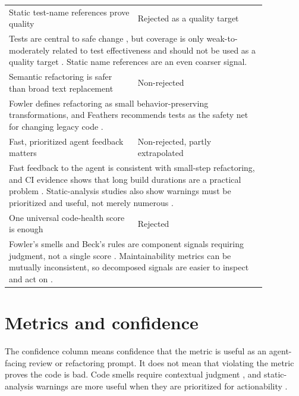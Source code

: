 \documentclass[11pt]{article}
\begin{document}
\begin{longtable}{p{0.43\linewidth}p{0.43\linewidth}}
\rowcolor{gray!18}
Static test-name references prove quality & Rejected as a quality target \\
\multicolumn{2}{p{0.86\linewidth}}{
Tests are central to safe change \cite{fowler-refactoring,feathers}, but coverage
is only weak-to-moderately related to test effectiveness and should not be used
as a quality target \cite{inozemtseva,kochhar}.  Static name references are an
even coarser signal.} \\[0.35em]

\rowcolor{gray!18}
Semantic refactoring is safer than broad text replacement & Non-rejected \\
\multicolumn{2}{p{0.86\linewidth}}{
Fowler defines refactoring as small behavior-preserving transformations, and
Feathers recommends tests as the safety net for changing legacy code
\cite{fowler-refactoring,feathers}.} \\[0.35em]

\rowcolor{gray!18}
Fast, prioritized agent feedback matters & Non-rejected, partly extrapolated \\
\multicolumn{2}{p{0.86\linewidth}}{
Fast feedback to the agent is consistent with small-step refactoring, and CI
evidence shows that long build durations are a practical problem
\cite{fowler-refactoring,ghaleb}.
Static-analysis studies also show warnings must be prioritized and useful, not
merely numerous \cite{vassallo,motwani}.} \\[0.35em]

\rowcolor{gray!18}
One universal code-health score is enough & Rejected \\
\multicolumn{2}{p{0.86\linewidth}}{
Fowler's smells and Beck's rules are component signals requiring judgment, not a
single score \cite{fowler-code-smell,fowler-beck}.  Maintainability metrics can
be mutually inconsistent, so decomposed signals are easier to inspect and act on
\cite{sjoberg}.} \\[0.35em]
\bottomrule
\end{longtable}

\section{Metrics and confidence}

The confidence column means confidence that the metric is useful as an
agent-facing review or refactoring prompt.  It does not mean that violating the
metric proves the code is bad.  Code smells require contextual judgment
\cite{fowler-code-smell}, and static-analysis warnings are more useful when they
are prioritized for actionability \cite{vassallo,motwani}.
\end{document}
